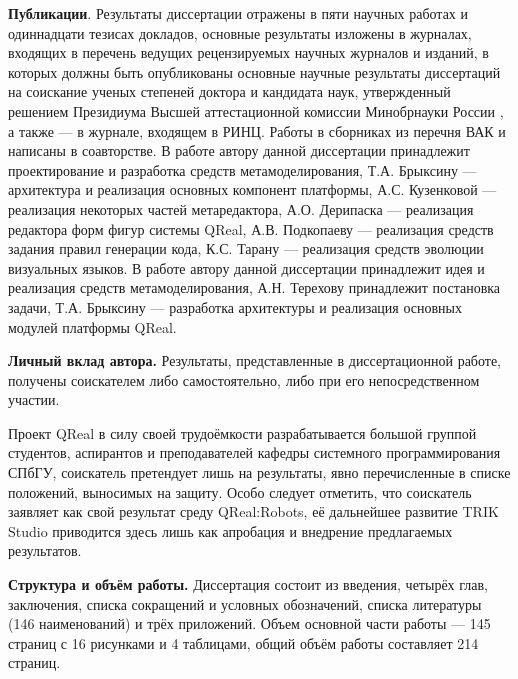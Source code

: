 \textbf{Публикации}. Результаты диссертации отражены в пяти научных работах и одиннадцати тезисах докладов, 
основные результаты изложены в журналах, входящих в перечень ведущих рецензируемых научных 
журналов и изданий, в которых должны быть опубликованы основные научные результаты диссертаций 
на соискание ученых степеней доктора и кандидата наук, утвержденный решением Президиума 
Высшей аттестационной комиссии Минобрнауки России ,
а также \cite{terekhov2009architecture, osechkina2010gestures} --- в журнале, входящем в РИНЦ. 
Работы в сборниках из перечня ВАК  и 
написаны в соавторстве. В работе  автору данной диссертации 
принадлежит проектирование и разработка средств метамоделирования, Т.А. Брыксину --- архитектура и реализация основных
компонент платформы, А.С. Кузенковой --- реализация некоторых частей метаредактора, А.О. Дерипаска
--- реализация редактора форм фигур системы QReal, А.В. Подкопаеву --- реализация средств задания правил генерации кода,
К.С. Тарану --- реализация средств эволюции визуальных языков. В работе 
автору данной диссертации принадлежит идея и реализация средств метамоделирования, А.Н. Терехову 
принадлежит постановка задачи, Т.А. Брыксину --- разработка архитектуры и реализация основных модулей платформы QReal.

\textbf{Личный вклад автора.} Результаты, представленные в диссертационной работе, получены 
соискателем либо самостоятельно, либо при его непосредственном участии.

Проект QReal в силу своей трудоёмкости разрабатывается большой группой студентов, аспирантов
и преподавателей кафедры системного программирования СПбГУ, соискатель претендует лишь на
результаты, явно перечисленные в списке положений, выносимых на защиту. Особо следует отметить,
что соискатель заявляет как свой результат среду QReal:Robots, её дальнейшее развитие 
TRIK Studio приводится здесь лишь как апробация и внедрение предлагаемых результатов.

\textbf{Структура и объём работы.} Диссертация состоит из введения, четырёх глав, заключения, 
списка сокращений и условных обозначений, списка литературы (146 наименований) и трёх 
приложений. Объем основной части работы --- 145 страниц с 16 рисунками и 4 таблицами, 
общий объём работы составляет 214 страниц.

